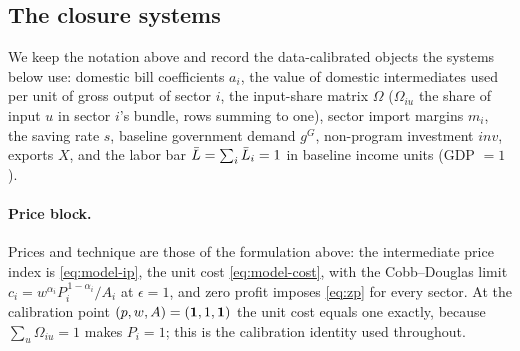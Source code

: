 \subsection{The closure systems}\label{app:closure-systems}

We keep the notation above and record the data-calibrated objects the
systems below use: domestic bill coefficients $a_i$, the value of domestic
intermediates used per unit of gross output of sector $i$, the input-share matrix $\Omega$ ($\Omega_{iu}$ the share of input $u$ in
sector $i$'s bundle, rows summing to one), sector import margins $m_i$, the
saving rate $s$, baseline government demand $g^G$, non-program investment
$inv$, exports $X$, and the labor bar $\bar{L} = \sum_i \bar L_i = 1$ in
baseline income units (GDP $=1$).

\paragraph{Price block.} Prices and technique are those of the formulation
above: the intermediate price index is \eqref{eq:model-ip}, the unit cost
\eqref{eq:model-cost}, with the Cobb--Douglas limit
$c_i = w^{\alpha_i} P_i^{\,1-\alpha_i}/A_i$ at $\epsilon = 1$, and zero
profit imposes \eqref{eq:zp} for every sector. At the calibration point $(p,w,A) = (\mathbf{1},1,\mathbf{1})$ the unit cost equals one
exactly, because $\sum_u \Omega_{iu} = 1$ makes $P_i = 1$; this is the
calibration identity used throughout.


